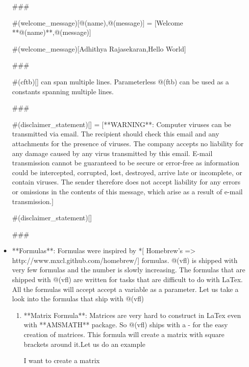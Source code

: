 \documentclass{article}
\begin{document}
\begin{itemize}
###


#(welcome_message)[@(name),@(message)] = [Welcome **@(name)**,@(message)] %


#(welcome_message)[Adhithya Rajasekaran,Hello World] %

###

#(cftb)[] can span multiple lines. Parameterless @(ftb) can be used as a constants spanning multiple lines. 

###


#(disclaimer_statement)[] = [**WARNING**: Computer viruses can be transmitted via email. 
The recipient should check this email and any attachments for the presence of viruses. 
The company accepts no liability for any damage caused by any virus transmitted by this email.
E-mail transmission cannot be guaranteed to be secure or error-free as information could be 
intercepted, corrupted, lost, destroyed, arrive late or incomplete, or contain viruses. 
The sender therefore does not accept liability for any errors or omissions in the 
contents of this message, which arise as a result of e-mail transmission.] 


#(disclaimer_statement)[] %

###

\item **Formulas**: Formulas were inspired by *[ Homebrew's => http://www.mxcl.github.com/homebrew/] formulas. @(vfl) is shipped with very few formulas
and the number is slowly increasing. The formulas that are shipped with @(vfl) are written for tasks that are difficult to do with LaTex. All the formulas will accept
accept a variable as a parameter. Let us take a look into the formulas that ship with @(vfl)

\begin{enumerate}

\item **Matrix Formula**: Matrices are very hard to construct in LaTex even with **AMSMATH** package. So @(vfl) ships with a -%
for the easy creation of matrices. This formula will create a matrix with square brackets around it.Let us do an example 

I want to create a matrix \vspace{5pt}


\end{enumerate}
\end{itemize}
\end{document}
